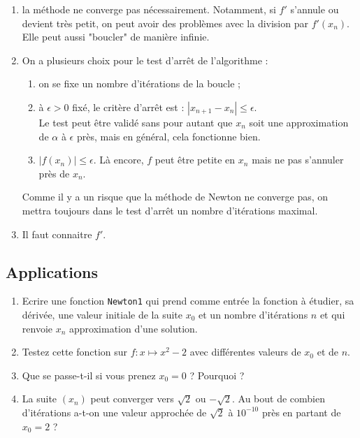 \begin{enumerate}
\item la m\' ethode ne converge pas n\' ecessairement. Notamment, si $f'$ s'annule ou devient tr\` es petit, on peut avoir des probl\` emes avec la division par $f'(x_n)$.\\
Elle peut aussi "boucler" de mani\` ere infinie. 
\item On a plusieurs choix pour le test d'arr\^ et de l'algorithme :
\begin{enumerate}
\item on se fixe un nombre d'it\' erations de la boucle ;
 \item \` a $\epsilon>0$ fix\' e, le crit\` ere d'arr\^ et est : $|x_{n+1}-x_n|\leqslant \epsilon$. \\
 Le test peut \^ etre valid\' e sans pour autant que $x_n$ soit une approximation de $\alpha$ \` a $\epsilon$ pr\` es, mais en g\' en\' eral, cela fonctionne bien.
 \item $|f(x_n)|\leqslant \epsilon$. L\` a encore, $f$ peut \^ etre petite en $x_n$ mais ne pas s'annuler pr\` es de $x_n$.
 \end{enumerate}
\noindent Comme il y a un risque que la m\' ethode de Newton ne converge pas, on mettra toujours dans le test d'arr\^ et un nombre d'it\' erations maximal.
\item Il faut connaitre $f'$.
\end{enumerate}


\subsection{Applications}
\begin{exercice}
\begin{enumerate}
\item Ecrire une fonction \verb?Newton1? qui prend comme entr\' ee la fonction \` a \' etudier, sa d\' eriv\' ee, une valeur initiale de la suite $x_0$ et un nombre d'it\' erations $n$ et qui renvoie $x_n$ approximation d'une  solution.
\item Testez cette fonction sur $f\colon x\mapsto x^2-2$ avec diff\' erentes valeurs de $x_0$ et de $n$.
\item Que se passe-t-il si vous prenez $x_0=0$ ? Pourquoi ?
\item La suite $(x_n)$ peut converger vers $\sqrt{2}$ ou $-\sqrt{2}$. Au bout de combien d'it\' erations a-t-on une valeur approch\' ee de $\sqrt{2}$ \` a $10^{-10}$ pr\` es en partant de $x_0=2$ ? 
\end{enumerate}
\end{exercice}




